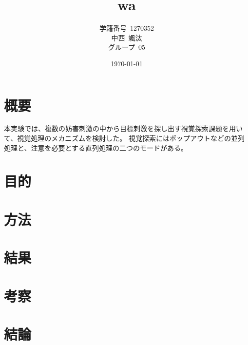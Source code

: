 \documentclass{jlreq}
\title{wa}
\author{学籍番号~1270352\\
        中西~颯汰\\
        グループ~05\\
        }
\date{\today}
\begin{document}
\maketitle
\clearpage
\tableofcontents
\clearpage
\section{概要}
本実験では、複数の妨害刺激の中から目標刺激を探し出す視覚探索課題を用いて、視覚処理のメカニズムを検討した。
視覚探索にはポップアウトなどの並列処理と、注意を必要とする直列処理の二つのモードがある。



\section{目的}
\section{方法}
\section{結果}
\section{考察}
\section{結論}
\begin{thebibliography}{9}

\url{}
\end{thebibliography}
\end{document}
